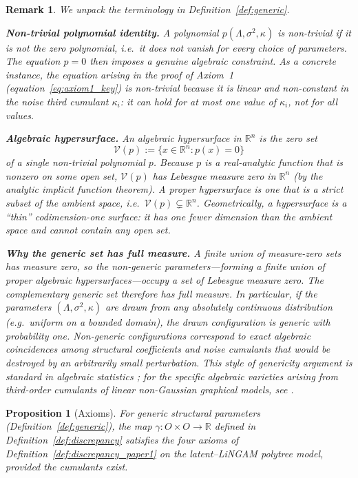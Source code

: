 \documentclass[11pt,a4paper]{article}
\numberwithin{equation}{section}
\newtheorem{proposition}[theorem]{Proposition}
\newtheorem{remark}[theorem]{Remark}
\begin{document}
\begin{remark}\label{rem:generic}
We unpack the terminology in Definition~\ref{def:generic}.

\medskip\noindent
\textbf{Non-trivial polynomial identity.}
A polynomial $p(\Lambda,\sigma^{2},\kappa)$ is \emph{non-trivial} if it is
not the zero polynomial, i.e.\ it does not vanish for \emph{every} choice
of parameters.  The equation $p=0$ then imposes a genuine algebraic
constraint.  As a concrete instance, the equation arising in the proof of
Axiom~1 (equation~\eqref{eq:axiom1_key}) is non-trivial because it is
linear and non-constant in the noise third cumulant $\kappa_i$: it can
hold for at most one value of $\kappa_i$, not for all values.

\medskip\noindent
\textbf{Algebraic hypersurface.}
An \emph{algebraic hypersurface} in $\mathbb{R}^{n}$ is the zero set
\[
  \mathcal{V}(p) := \{x \in \mathbb{R}^{n} : p(x) = 0\}
\]
of a single non-trivial polynomial $p$.  Because $p$ is a real-analytic
function that is nonzero on some open set, $\mathcal{V}(p)$ has Lebesgue
measure zero in $\mathbb{R}^n$ (by the analytic implicit function theorem).
A \emph{proper} hypersurface is one that is a strict subset of the
ambient space, i.e.\ $\mathcal{V}(p) \subsetneq \mathbb{R}^{n}$.
Geometrically, a hypersurface is a ``thin'' codimension-one surface: it
has one fewer dimension than the ambient space and cannot contain any
open set.

\medskip\noindent
\textbf{Why the generic set has full measure.}
A finite union of measure-zero sets has measure zero, so the
\emph{non-generic} parameters---forming a finite union of proper algebraic
hypersurfaces---occupy a set of Lebesgue measure zero.  The complementary
\emph{generic} set therefore has full measure.  In particular, if the
parameters $(\Lambda,\sigma^{2},\kappa)$ are drawn from any absolutely
continuous distribution (e.g.\ uniform on a bounded domain), the drawn
configuration is generic with probability one.  Non-generic configurations
correspond to exact algebraic coincidences among structural coefficients
and noise cumulants that would be destroyed by an arbitrarily small
perturbation.  This style of genericity argument is standard in algebraic
statistics \citep{drton:strumfeld:2009}; for the specific algebraic
varieties arising from third-order cumulants of linear non-Gaussian
graphical models, see \citet{amendola:drton:2021}.
\end{remark}

\begin{proposition}[Axioms]\label{prop:axioms}
For generic structural parameters 
(Definition~\ref{def:generic}), the map 
$\gamma:O\times O\to\mathbb R$ defined in 
Definition~\ref{def:discrepancy} satisfies the four axioms of 
Definition~\ref{def:discrepancy_paper1} on the latent--LiNGAM polytree 
model, provided the cumulants exist.
\end{proposition}
\end{document}
